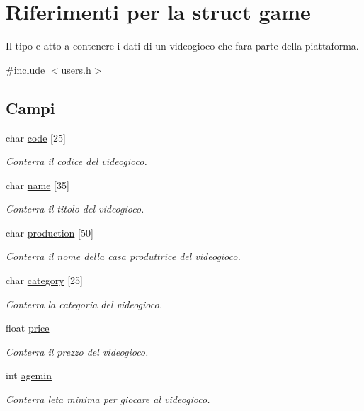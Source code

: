 \hypertarget{structgame}{}\section{Riferimenti per la struct game}
\label{structgame}


Il tipo e\textquotesingle{} atto a contenere i dati di un videogioco che fara\textquotesingle{} parte della piattaforma.  




{\ttfamily \#include $<$users.\+h$>$}

\subsection*{Campi}
\begin{DoxyCompactItemize}
\item 
char \hyperlink{structgame_aa8fa3d611dae3fe6dbf21a9a8c159f50}{code} \mbox{[}25\mbox{]}
\begin{DoxyCompactList}\small\item\em Conterra\textquotesingle{} il codice del videogioco. \end{DoxyCompactList}\item 
char \hyperlink{structgame_a6a9fb0917f60e741c09f7955feccfd7d}{name} \mbox{[}35\mbox{]}
\begin{DoxyCompactList}\small\item\em Conterra\textquotesingle{} il titolo del videogioco. \end{DoxyCompactList}\item 
char \hyperlink{structgame_a21702a02fe973a0e76d0976c4aa2e7b5}{production} \mbox{[}50\mbox{]}
\begin{DoxyCompactList}\small\item\em Conterra\textquotesingle{} il nome della casa produttrice del videogioco. \end{DoxyCompactList}\item 
char \hyperlink{structgame_ab3ae261d92cc8a130d350f72d092846d}{category} \mbox{[}25\mbox{]}
\begin{DoxyCompactList}\small\item\em Conterra\textquotesingle{} la categoria del videogioco. \end{DoxyCompactList}\item 
float \hyperlink{structgame_ae1753fa006ae874f813b8e52f5530c86}{price}
\begin{DoxyCompactList}\small\item\em Conterra\textquotesingle{} il prezzo del videogioco. \end{DoxyCompactList}\item 
int \hyperlink{structgame_a998f339d815e453842cbc20c5ab34d4d}{agemin}
\begin{DoxyCompactList}\small\item\em Conterra\textquotesingle{} l\textquotesingle{}eta\textquotesingle{} minima per giocare al videogioco. \end{DoxyCompactList}\end{DoxyCompactItemize}


